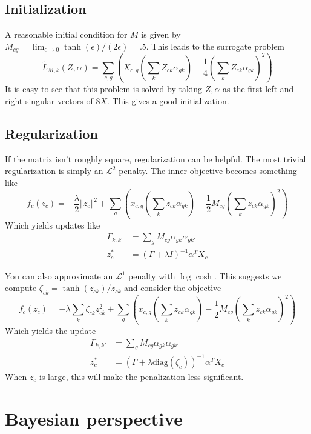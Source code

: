 \documentclass{article}
\begin{document}
\subsection{Initialization}

A reasonable initial condition for $M$ is given by $M_{cg}=\lim_{\epsilon\rightarrow 0}\tanh(\epsilon)/(2\epsilon) = .5$.  This leads to the surrogate problem
\[
\tilde L_{M,k}(Z,\alpha) = \sum_{c,g} \left(X_{c,g}\left(\sum_k Z_{ck} \alpha_{gk}\right) - \frac{1}{4}\left(\sum_k Z_{ck} \alpha_{gk}\right)^2 \right)
\]
It is easy to see that this problem is solved by taking $Z,\alpha$ as the first left and right singular vectors of $8X$.  This gives a good initialization.

\subsection{Regularization}

If the matrix isn't roughly square, regularization can be helpful.  The most trivial regularization is simply an $\mathscr L^2$ penalty.  The inner objective becomes something like
\[
f_c(z_c) = -\frac{\lambda}{2}\left\Vert z_c\right\Vert^2 + \sum_{g}\left(x_{c,g}\left(\sum_k z_{ck} \alpha_{gk}\right) - \frac{1}{2}M_{cg}\left(\sum_k z_{ck} \alpha_{gk}\right)^2 \right)
\]
Which yields updates like
\begin{align*}
\Gamma_{k,k'} &= \sum_g M_{cg}\alpha_{gk}\alpha_{gk'}\\
z_c^* &= (\Gamma+\lambda I)^{-1} \alpha^T X_c
\end{align*}

You can also approximate an $\mathscr L^1$ penalty with $\log \cosh$.  This suggests we compute $\zeta_{ck}=\tanh(z_{ck})/z_{ck}$ and consider the objective
\[
f_c(z_c) = -\lambda \sum_k \zeta_{ck} z_{ck}^2 + \sum_{g}\left(x_{c,g}\left(\sum_k z_{ck} \alpha_{gk}\right) - \frac{1}{2}M_{cg}\left(\sum_k z_{ck} \alpha_{gk}\right)^2 \right)
\]
Which yields the update
\begin{align*}
\Gamma_{k,k'} &= \sum_g M_{cg}\alpha_{gk}\alpha_{gk'}\\
z_c^* &= (\Gamma+\lambda \mathrm{diag}(\zeta_c))^{-1} \alpha^T X_c
\end{align*}
When $z_c$ is large, this will make the penalization less significant. 

\section{Bayesian perspective}
\end{document}
